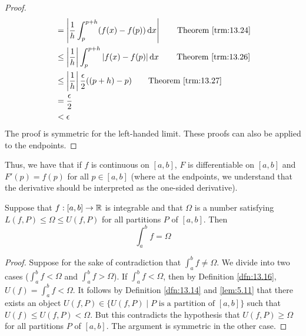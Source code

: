 \documentclass[../main.tex]{subfiles}
\begin{document}
\begin{theorem}
\begin{proof}
\begin{align*}
            &= \left| \frac{1}{h}\int_p^{p+h}(f(x)-f(p))\dd{x} \right|\tag*{Theorem \ref{trm:13.24}}\\
            &\leq \left| \frac{1}{h} \right|\int_p^{p+h}|f(x)-f(p)|\dd{x}\tag*{Theorem \ref{trm:13.26}}\\
            &\leq \left| \frac{1}{h} \right|\frac{\epsilon}{2}((p+h)-p)\tag*{Theorem \ref{trm:13.27}}\\
            &= \frac{\epsilon}{2}\\
            &< \epsilon
        \end{align*}
        \endgroup
        The proof is symmetric for the left-handed limit. These proofs can also be applied to the endpoints.
    \end{proof}
\end{theorem}

\begin{remark}\label{rmk:14.2}
    Thus, we have that if $f$ is continuous on $[a,b]$, $F$ is differentiable on $[a,b]$ and $F'(p)=f(p)$ for all $p\in[a,b]$ (where at the endpoints, we understand that the derivative should be interpreted as the one-sided derivative).
\end{remark}

\begin{lemma}\label{lem:14.3}
    Suppose that $f:[a,b]\to\mathbb{R}$ is integrable and that $\Omega$ is a number satisfying $L(f,P)\leq\Omega\leq U(f,P)$ for all partitions $P$ of $[a,b]$. Then
    \begin{equation*}
        \int_a^bf = \Omega
    \end{equation*}
    \begin{proof}
        Suppose for the sake of contradiction that $\int_a^bf\neq\Omega$. We divide into two cases ($\int_a^bf<\Omega$ and $\int_a^bf>\Omega$). If $\int_a^bf<\Omega$, then by Definition \ref{dfn:13.16}, $U(f)=\int_a^bf<\Omega$. It follows by Definition \ref{dfn:13.14} and \ref{lem:5.11} that there exists an object $U(f,P)\in\{U(f,P)\mid P\text{ is a partition of }[a,b]\}$ such that $U(f)\leq U(f,P)<\Omega$. But this contradicts the hypothesis that $U(f,P)\geq\Omega$ for all partitions $P$ of $[a,b]$. The argument is symmetric in the other case.
    \end{proof}
\end{lemma}
\end{document}
